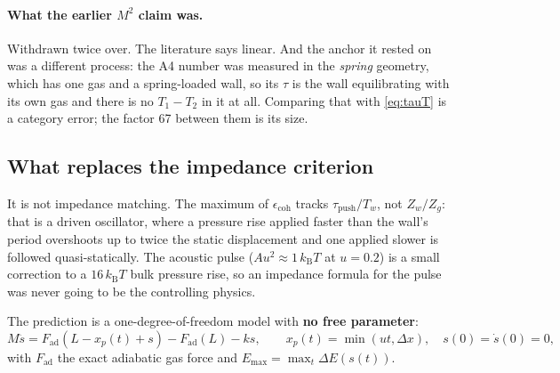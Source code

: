\documentclass[11pt,a4paper]{article}
\newcommand{\kT}{k_{\mathrm B}T}
\begin{document}
\paragraph{What the earlier $M^2$ claim was.} Withdrawn twice over. The literature says linear. And
the anchor it rested on was a different process: the A4 number was measured in the \emph{spring}
geometry, which has one gas and a spring-loaded wall, so its $\tau$ is the wall equilibrating with
its own gas and there is no $T_1-T_2$ in it at all. Comparing that with \eqref{eq:tauT} is a
category error; the factor 67 between them is its size.

\subsection{What replaces the impedance criterion}\label{sec:l3acoustic}

It is not impedance matching. The maximum of $\epsilon_{\mathrm{coh}}$ tracks
$\tau_{\mathrm{push}}/T_w$, not $Z_w/Z_g$: that is a driven oscillator, where a pressure rise
applied faster than the wall's period overshoots up to twice the static displacement and one applied
slower is followed quasi-statically. The acoustic pulse ($Au^2 \approx 1\,\kT$ at $u = 0.2$) is a
small correction to a $16\,\kT$ bulk pressure rise, so an impedance formula for the pulse was never
going to be the controlling physics.

The prediction is a one-degree-of-freedom model with \textbf{no free parameter}:
\begin{equation}
M \ddot s = F_{\mathrm{ad}}(L - x_p(t) + s) - F_{\mathrm{ad}}(L) - k s , \qquad
x_p(t) = \min(u t, \Delta x), \quad s(0) = \dot s(0) = 0,
\label{eq:onedof}
\end{equation}
with $F_{\mathrm{ad}}$ the exact adiabatic gas force and $E_{\mathrm{max}} = \max_t \Delta E(s(t))$.
\end{document}
